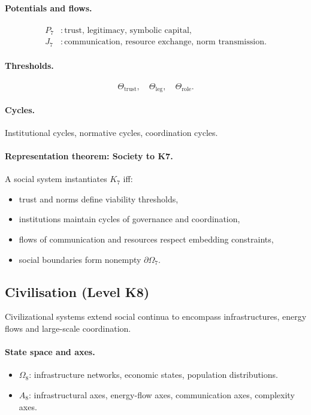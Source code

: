 \paragraph{Potentials and flows.}
\[
\begin{aligned}
  P_7 &: \text{trust, legitimacy, symbolic capital},\\
  J_7 &: \text{communication, resource exchange, norm transmission}.
\end{aligned}
\]

\paragraph{Thresholds.}
\[
  \Theta_{\mathrm{trust}},\quad
  \Theta_{\mathrm{leg}},\quad
  \Theta_{\mathrm{role}}.
\]

\paragraph{Cycles.}
Institutional cycles, normative cycles, coordination cycles.

\paragraph{Representation theorem: Society to K7.}
A social system instantiates \(K_7\) iff:
\begin{itemize}
  \item trust and norms define viability thresholds,
  \item institutions maintain cycles of governance and coordination,
  \item flows of communication and resources respect embedding constraints,
  \item social boundaries form nonempty \(\partial\Omega_7\).
\end{itemize}

\subsection{Civilisation (Level K8)}

Civilizational systems extend social continua to encompass infrastructures,
energy flows and large-scale coordination.

\paragraph{State space and axes.}
\begin{itemize}
  \item \(\Omega_8\): infrastructure networks, economic states, population
        distributions.
  \item \(A_8\): infrastructural axes, energy-flow axes, communication axes,
        complexity axes.
\end{itemize}

